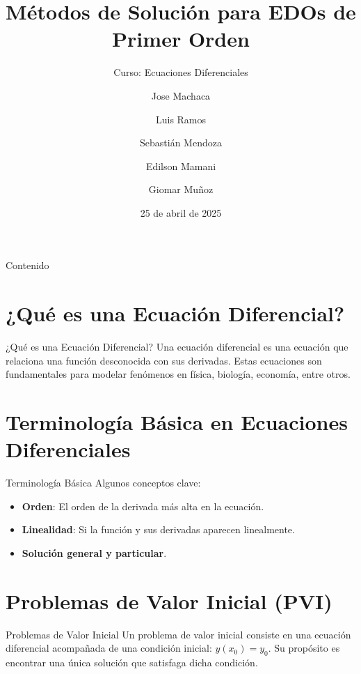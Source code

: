 \documentclass{beamer}
\title[Métodos EDO 1\textsuperscript{er} orden]{Métodos de Solución para EDOs de Primer Orden}
\subtitle{Curso: Ecuaciones Diferenciales}
\author{Jose Machaca \and Luis Ramos \and Sebastián Mendoza \and Edilson Mamani \and Giomar Muñoz}
\date{25 de abril de 2025}
\begin{document}
\begin{frame}
  \titlepage
\end{frame}

\begin{frame}{Contenido}
  \tableofcontents
\end{frame}

\section{¿Qué es una Ecuación Diferencial?}
\begin{frame}{¿Qué es una Ecuación Diferencial?}
Una ecuación diferencial es una ecuación que relaciona una función desconocida con sus derivadas. Estas ecuaciones son fundamentales para modelar fenómenos en física, biología, economía, entre otros.
\end{frame}

\section{Terminología Básica en Ecuaciones Diferenciales}
\begin{frame}{Terminología Básica}
Algunos conceptos clave:
\begin{itemize}
  \item \textbf{Orden}: El orden de la derivada más alta en la ecuación.
  \item \textbf{Linealidad}: Si la función y sus derivadas aparecen linealmente.
  \item \textbf{Solución general y particular}.
\end{itemize}
\end{frame}

\section{Problemas de Valor Inicial (PVI)}
\begin{frame}{Problemas de Valor Inicial}
Un problema de valor inicial consiste en una ecuación diferencial acompañada de una condición inicial: $y(x_0) = y_0$. Su propósito es encontrar una única solución que satisfaga dicha condición.
\end{frame}
\end{document}
